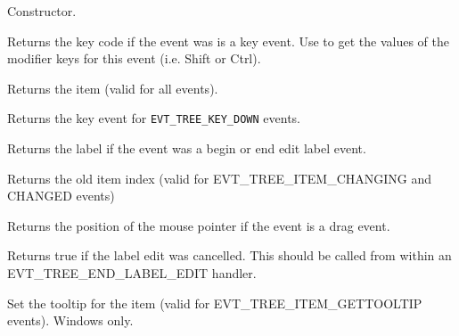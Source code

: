


\label{wxtreeeventctor}


Constructor.

\label{wxtreeeventgetkeycode}


Returns the key code if the event was is a key event. Use 
 to get the values of the
modifier keys for this event (i.e. Shift or Ctrl).

\label{wxtreeeventgetitem}


Returns the item (valid for all events).

\label{wxtreeeventgetkeyevent}


Returns the key event for {\tt EVT\_TREE\_KEY\_DOWN} events.

\label{wxtreeeventgetlabel}


Returns the label if the event was a begin or end edit label event.

\label{wxtreeeventgetolditem}


Returns the old item index (valid for EVT\_TREE\_ITEM\_CHANGING and CHANGED events)

\label{wxtreeeventgetpoint}


Returns the position of the mouse pointer if the event is a drag event.

\label{wxtreeeventiseditcancelled}


Returns true if the label edit was cancelled. This should be
called from within an EVT\_TREE\_END\_LABEL\_EDIT handler.

\label{wxtreeeventsettooltip}


Set the tooltip for the item (valid for EVT\_TREE\_ITEM\_GETTOOLTIP events).
Windows only.


